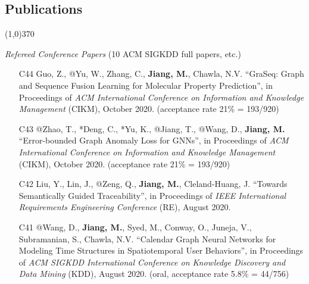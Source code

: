 \documentclass[10pt]{article}
\newenvironment{myindentpar}[1]%
{\begin{list}{}%
         {\setlength{\leftmargin}{#1}}%
         \item[]%
}
{\end{list}}
\newcounter{list}
\begin{document}
\newpage

\vspace{-0.6cm}
\subsection{}
\subsection{\sc Publications}
\vspace{-0.4cm} \line(1,0){370} \vspace{-0.1cm}

\begin{myindentpar}{0.00cm}

\hspace{-0.25cm}\textit{Refereed Conference Papers} {\small (10 ACM SIGKDD full papers, etc.)}

\begin{enumerate}[leftmargin=.5cm]

\item[C44] Guo, Z., @Yu, W., Zhang, C., \textbf{Jiang, M.}, Chawla, N.V. ``GraSeq: Graph and Sequence Fusion Learning for Molecular Property Prediction'', in Proceedings of \textit{ACM International Conference on Information and Knowledge Management} (CIKM), October 2020. (acceptance rate 21\% = 193/920)
		
\item[C43] @Zhao, T., *Deng, C., *Yu, K., @Jiang, T., @Wang, D., \textbf{Jiang, M.} ``Error-bounded Graph Anomaly Loss for GNNs'', in Proceedings of \textit{ACM International Conference on Information and Knowledge Management} (CIKM), October 2020. (acceptance rate 21\% = 193/920)

\item[C42] Liu, Y., Lin, J., @Zeng, Q., \textbf{Jiang, M.}, Cleland-Huang, J. ``Towards Semantically Guided Traceability'', in Proceedings of \textit{IEEE International Requirements Engineering Conference} (RE), August 2020.	

\item[C41] @Wang, D., \textbf{Jiang, M.}, Syed, M., Conway, O., Juneja, V., Subramanian, S., Chawla, N.V. ``Calendar Graph Neural Networks for Modeling Time Structures in Spatiotemporal User Behaviors'', in Proceedings of \textit{ACM SIGKDD International Conference on Knowledge Discovery and Data Mining} (KDD), August 2020. (oral, acceptance rate 5.8\% = 44/756)


\end{enumerate}
\end{myindentpar}
\end{document}
